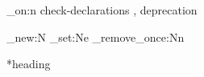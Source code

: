 \ExplSyntaxOn
\debug_on:n { check-declarations , deprecation }
\ExplSyntaxOff




\errorstopmode

\pagestyle{empty}


\ExplSyntaxOn
\str_new:N \TestCommandName
\str_set:Ne \TestCommandName {\jobname}
\str_remove_once:Nn 
\ExplSyntaxOff


\START

\UseName{\TestCommandName}*{heading}


